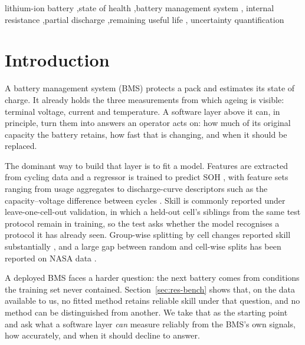 \documentclass[preprint,12pt,authoryear]{elsarticle}
\begin{document}
\begin{frontmatter}
\begin{keyword}
lithium-ion battery \sep state of health \sep battery management system \sep
internal resistance \sep partial discharge \sep remaining useful life \sep
uncertainty quantification
\end{keyword}

\end{frontmatter}

\linenumbers

\section{Introduction}
\label{sec:intro}

A battery management system (BMS) protects a pack and estimates its state of
charge. It already holds the three measurements from which ageing is visible:
terminal voltage, current and temperature. A software layer above it can, in
principle, turn them into answers an operator acts on: how much of its original
capacity the battery retains, how fast that is changing, and when it should be
replaced.

The dominant way to build that layer is to fit a model. Features are
extracted from cycling data and a regressor is trained to predict SOH
\citep{berecibar2016,waag2014}, with feature sets ranging
from usage aggregates to discharge-curve descriptors such as the
capacity--voltage difference between cycles \citep{severson2019}. Skill is
commonly reported under leave-one-cell-out validation, in which a held-out
cell's siblings from the same test protocol remain in training, so the test
asks whether the model recognises a protocol it has already seen. Group-wise
splitting by cell changes reported skill substantially \citep{maher2025}, and
a large gap between random and cell-wise splits has been reported on NASA data
\citep{le2026}.

A deployed BMS faces a harder question: the next battery comes from
conditions the training set never contained. Section~\ref{sec:res-bench}
shows that, on the data available to us, no fitted method retains reliable
skill under that question, and no method can be distinguished from another.
We take that as the starting point and ask what a software layer \emph{can}
measure reliably from the BMS's own signals, how accurately, and when it should
decline to answer.
\end{document}
